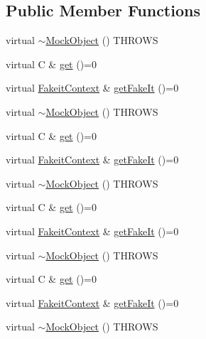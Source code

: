\subsection*{Public Member Functions}
\begin{DoxyCompactItemize}
\item 
virtual \mbox{\hyperlink{structfakeit_1_1MockObject_aba533bcf929bb012934089f767e9863c}{$\sim$\+Mock\+Object}} () T\+H\+R\+O\+WS
\item 
virtual C \& \mbox{\hyperlink{structfakeit_1_1MockObject_a0212799b76097b93a51993cb3af0894a}{get}} ()=0
\item 
virtual \mbox{\hyperlink{structfakeit_1_1FakeitContext}{Fakeit\+Context}} \& \mbox{\hyperlink{structfakeit_1_1MockObject_a26a2fa3fff133e8cb848b0757f58c6b6}{get\+Fake\+It}} ()=0
\item 
virtual \mbox{\hyperlink{structfakeit_1_1MockObject_aba533bcf929bb012934089f767e9863c}{$\sim$\+Mock\+Object}} () T\+H\+R\+O\+WS
\item 
virtual C \& \mbox{\hyperlink{structfakeit_1_1MockObject_a0212799b76097b93a51993cb3af0894a}{get}} ()=0
\item 
virtual \mbox{\hyperlink{structfakeit_1_1FakeitContext}{Fakeit\+Context}} \& \mbox{\hyperlink{structfakeit_1_1MockObject_a26a2fa3fff133e8cb848b0757f58c6b6}{get\+Fake\+It}} ()=0
\item 
virtual \mbox{\hyperlink{structfakeit_1_1MockObject_aba533bcf929bb012934089f767e9863c}{$\sim$\+Mock\+Object}} () T\+H\+R\+O\+WS
\item 
virtual C \& \mbox{\hyperlink{structfakeit_1_1MockObject_a0212799b76097b93a51993cb3af0894a}{get}} ()=0
\item 
virtual \mbox{\hyperlink{structfakeit_1_1FakeitContext}{Fakeit\+Context}} \& \mbox{\hyperlink{structfakeit_1_1MockObject_a26a2fa3fff133e8cb848b0757f58c6b6}{get\+Fake\+It}} ()=0
\item 
virtual \mbox{\hyperlink{structfakeit_1_1MockObject_aba533bcf929bb012934089f767e9863c}{$\sim$\+Mock\+Object}} () T\+H\+R\+O\+WS
\item 
virtual C \& \mbox{\hyperlink{structfakeit_1_1MockObject_a0212799b76097b93a51993cb3af0894a}{get}} ()=0
\item 
virtual \mbox{\hyperlink{structfakeit_1_1FakeitContext}{Fakeit\+Context}} \& \mbox{\hyperlink{structfakeit_1_1MockObject_a26a2fa3fff133e8cb848b0757f58c6b6}{get\+Fake\+It}} ()=0
\item 
virtual \mbox{\hyperlink{structfakeit_1_1MockObject_aba533bcf929bb012934089f767e9863c}{$\sim$\+Mock\+Object}} () T\+H\+R\+O\+WS

\end{DoxyCompactItemize}

